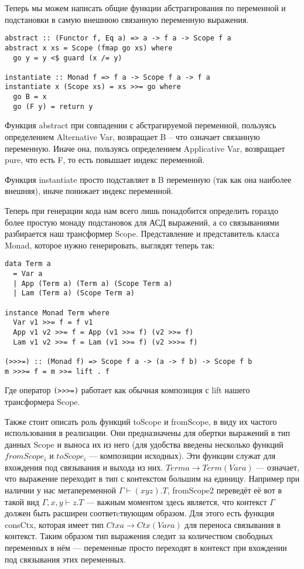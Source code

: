 Теперь мы можем написать общие функции абстрагирования по переменной и подстановки в самую внешнюю связанную переменную выражения.
\begin{lstlisting}[frame=single]
abstract :: (Functor f, Eq a) => a -> f a -> Scope f a
abstract x xs = Scope (fmap go xs) where
  go y = y <$ guard (x /= y)

instantiate :: Monad f => f a -> Scope f a -> f a
instantiate x (Scope xs) = xs >>= go where
  go B = x
  go (F y) = return y
\end{lstlisting}

Функция abstract при совпадении с абстрагируемой переменной, пользуясь определением Alternative Var, возвращает B -- что означает связанную переменную. Иначе она, пользуясь определением Applicative Var, возвращает pure, что есть F, то есть повышает индекс переменной.

Функция instantiate просто подставляет в B переменную (так как она наиболее внешняя), иначе понижает индекс переменной.

Теперь при генерации кода нам всего лишь понадобится определить гораздо более простую монаду подстановок для АСД выражений, а со связываниями разбирается наш трансформер Scope. Представление и представитель класса Monad, которое нужно генерировать, выглядят теперь так:

\begin{lstlisting}[frame=single]
data Term a
  = Var a
  | App (Term a) (Term a) (Scope Term a)
  | Lam (Term a) (Scope Term a)

instance Monad Term where
  Var v1 >>= f = f v1
  App v1 v2 >>= f = App (v1 >>= f) (v2 >>= f)
  Lam v1 v2 >>= f = Lam (v1 >>= f) (v2 >>>= f)

(>>>=) :: (Monad f) => Scope f a -> (a -> f b) -> Scope f b
m >>>= f = m >>= lift . f
\end{lstlisting}

Где оператор \lstinline{(>>>=)} работает как обычная композиция с lift нашего трансформера Scope.

Также стоит описать роль функций toScope и fromScope, в виду их частого использования в реализации. Они предназначены для обертки выражений в тип данных Scope и выноса их из него (для удобства введены несколько функций $fromScope_i$ и $toScope_i$ --- композиции исходных). Эти функции служат для вхождения под связывания и выхода из них. $Term a \rightarrow Term (Var a)$ --- означает, что выражение переходит в тип с контекстом большим на единицу. Например при наличии у нас метапеременной $\Gamma \vdash (x y z).T$, fromScope2 переведёт её вот в такой вид $\Gamma, x, y \vdash z.T$ --- важным моментом здесь является, что контекст $\Gamma$ должен быть расширен соответcтвующим образом. Для этого есть функция consCtx, которая имеет тип $Ctx a \rightarrow Ctx (Var a)$ для переноса связывания в контекст. Таким образом тип выражения следит за количеством свободных переменных в нём --- переменные просто переходят в контекст при вхождении под связывания этих переменных.

